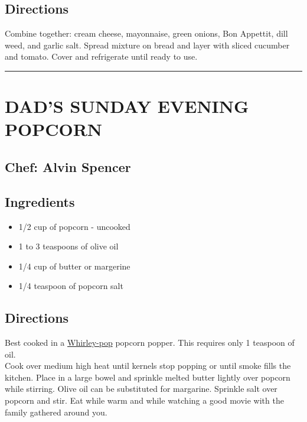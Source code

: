 \documentclass[
]{book}
\providecommand{\tightlist}{%
  \setlength{\itemsep}{0pt}\setlength{\parskip}{0pt}}
\begin{document}
\hypertarget{directions-3}{%
\subsection*{Directions}\label{directions-3}}


Combine together: cream cheese, mayonnaise, green onions, Bon Appettit, dill weed, and garlic salt.
Spread mixture on bread and layer with sliced cucumber and tomato. Cover and refrigerate until ready to use.

\begin{center}\rule{0.5\linewidth}{0.5pt}\end{center}

\hypertarget{dads-sunday-evening-popcorn}{%
\section*{DAD'S SUNDAY EVENING POPCORN}\label{dads-sunday-evening-popcorn}}


\hypertarget{chef-alvin-spencer}{%
\subsection*{Chef: Alvin Spencer}\label{chef-alvin-spencer}}


\hypertarget{ingredients-4}{%
\subsection*{Ingredients}\label{ingredients-4}}


\begin{itemize}
\tightlist
\item
  1/2 cup of popcorn - uncooked
\item
  1 to 3 teaspoons of olive oil
\item
  1/4 cup of butter or margerine
\item
  1/4 teaspoon of popcorn salt
\end{itemize}

\hypertarget{directions-4}{%
\subsection*{Directions}\label{directions-4}}


Best cooked in a \href{https://www.whirleypopshop.com/}{Whirley-pop} popcorn popper. This requires only 1 teaspoon of oil.\\
Cook over medium high heat until kernels stop popping or until smoke fills the kitchen.
Place in a large bowel and sprinkle melted butter lightly over popcorn while stirring. Olive oil can be substituted for margarine.
Sprinkle salt over popcorn and stir. Eat while warm and while watching a good movie with the family gathered around you.
\end{document}
